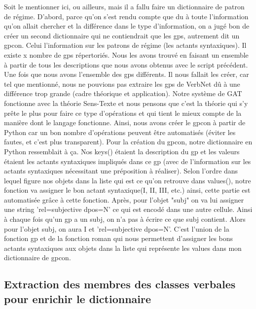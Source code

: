 Soit le mentionner ici, ou ailleurs, mais il a fallu faire un dictionnaire de patron de régime. D'abord, parce qu'on s'est rendu compte que du à toute l'information qu'on allait chercher et la différence dans le type d'information, on a jugé bon de créer un second dictionnaire qui ne contiendrait que les gps, autrement dit un gpcon. Celui l'information sur les patrons de régime (les actants syntaxiques). Il existe x nombre de gps répertoriés. Nous les avons trouvé en faisant un ensemble à partir de tous les descriptions que nous avons obtenus avec le script précédent. Une fois que nous avons l'ensemble des gps différents. Il nous fallait les créer, car tel que mentionné, nous ne pouvions pas extraire les gps de VerbNet dû à une différence trop grande (cadre théorique et application). Notre système de GAT fonctionne avec la théorie Sens-Texte et nous pensons que c'est la théorie qui s'y prête le plus pour faire ce type d'opérations et qui tient le mieux compte de la manière dont le langage fonctionne. Ainsi, nous avons créer le gpcon à partir de Python car un bon nombre d'opérations peuvent être automatisés (éviter les fautes, et c'est plus transparent). Pour la création du gpcon, notre dictionnaire en Python ressemblait à ça. Nos keys() étaient la description du gp et les valeurs étaient les actants syntaxiques impliqués dans ce gp (avec de l'information sur les actants syntaxiques nécessitant une préposition à réaliser). Selon l'ordre dans lequel figure nos objets dans la liste qui est ce qu'on retrouve dans values(), notre fonction va assigner le bon actant syntaxique(I, II, III, etc.) ainsi, cette partie est automatisée grâce à cette fonction. Après, pour l'objet "subj" on va lui assigner une string 'rel=subjective dpos=N' ce qui est encodé dans une autre cellule. Ainsi à chaque fois qu'un gp a  un subj, on n'a pas à écrire ce que subj contient. Alors pour l'objet subj, on aura I et 'rel=subjective dpos=N'. C'est l'union de la fonction gp et de la fonction roman qui nous permettent d'assigner les bons actants syntaxiques aux objets dans la liste qui représente les values dans mon dictionnaire de gpcon.

\subsection{Extraction des membres des classes verbales pour enrichir le dictionnaire}

